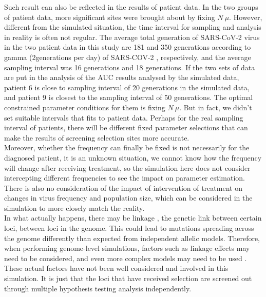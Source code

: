 \documentclass[12pt]{article}
\begin{document}
Such result can also be reflected in the results of patient data. In the two groups of patient data, more significant sites were brought about by fixing $N\ \mu$. However, different from the simulated situation, the time interval for sampling and analysis in reality is often not regular. The average total generation of SARS-CoV-2 virus in the two patient data in this study are 181 and 350 generations according to gamma (2generations per day) of SARS-COV-2 \citep{markov2023evolution}, respectively, and the average sampling interval was 16 generations and 18 generations. If the two sets of data are put in the analysis of the AUC results analysed by the simulated data, patient 6 is close to sampling interval of 20 generations in the simulated data, and patient 9 is closest to the sampling interval of 50 generations. The optimal constrained parameter conditions for them is fixing $N\ \mu$. But in fact, we didn't set suitable intervals that fits to patient data. Perhaps for the real sampling interval of patients, there will be different fixed parameter selections that can make the results of screening selection sites more accurate.\\

Moreover, whether the frequency can finally be fixed is not necessarily for the diagnosed patient, it is an unknown situation, we cannot know how the frequency will change after receiving treatment, so the simulation here does not consider intercepting different frequencies to see the impact on parameter estimation. There is also no consideration of the impact of intervention of treatment on changes in virus frequency and population size, which can be considered in the simulation to more closely match the reality.\\ 

In what actually happens, there may be linkage \citep{lewontin1960evolutionary}, the genetic link between certain loci, between loci in the genome. This could lead to mutations spreading across the genome differently than expected from independent allelic models. Therefore, when performing genome-level simulations, factors such as linkage effects may need to be considered, and even more complex models may need to be used \citep{slatkin2008linkage}. These actual factors have not been well considered and involved in this simulation. It is just that the loci that have received selection are screened out through multiple hypothesis testing analysis independently.


\newpage
\end{document}
